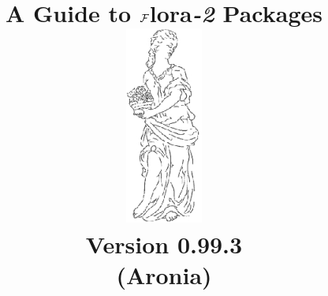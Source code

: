 \documentclass[11pt]{report}
\begin{document}
\newcommand{\FLORA}{{\mbox{\sc ${\cal F}${lora}\rm\emph{-2}}}\xspace}
\newcommand{\fl}{F-logic }

\newcommand{\fd}{{\mbox{\tt \,->\,}}}                   %
\newcommand{\bfd}{{\mbox{\tt \,*->\,}}}            %
\newcommand{\mvd}{{\mbox{\tt \,->\,}}}  %
\newcommand{\bmvd}{{\mbox{\tt \,*->\,}}}              %
\newcommand{\Fd}{{\mbox{\tt \,=>\,}}}                      %
\newcommand{\Mvd}{{\mbox{\tt \,=>\,}}}  %
\newcommand{\bFd}{{\mbox{\tt \,*=>\,}}}                      %
\newcommand{\bMvd}{{\mbox{\tt \,*=>\,}}}  %
\newcommand{\thismodule}{{\tt \_@}\xspace}

\def\Protege{Prot\'{e}g\'{e} }
\def\NoProtege{Prot\'{e}g\'{e}}

\title{\bf A Guide to \FLORA Packages
        \vspace{0.7cm}\\
 \includegraphics[width=1in]{floralogo} 
           \vspace{3mm}\\
       {\Large Version 0.99.3}
       \\
       {\large (Aronia)}
}


\maketitle


\thispagestyle{empty}
\newpage
\thispagestyle{empty}

\tableofcontents
\newpage        %
  




\end{document}
